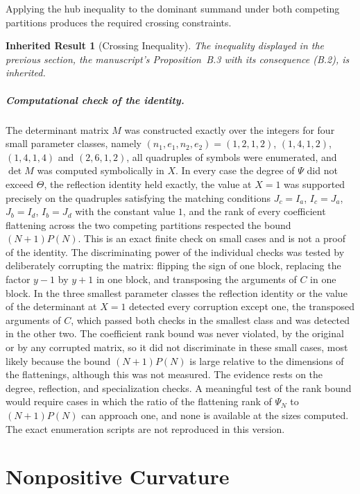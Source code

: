 \documentclass[11pt,letterpaper]{report}
\theoremstyle{plain}
\newtheorem{inherited}[theorem]{Inherited Result}
\theoremstyle{definition}
\theoremstyle{remark}
\begin{document}
Applying the hub inequality to the dominant summand under both competing partitions produces the required crossing constraints.

\begin{inherited}[Crossing Inequality]
The inequality displayed in the previous section, the manuscript's Proposition~B.3 with its consequence (B.2), is inherited.
\end{inherited}

\paragraph{Computational check of the identity.}
The determinant matrix $M$ was constructed exactly over the integers for four small parameter classes, namely $(n_1,e_1,n_2,e_2)=(1,2,1,2)$, $(1,4,1,2)$, $(1,4,1,4)$ and $(2,6,1,2)$, all quadruples of symbols were enumerated, and $\det M$ was computed symbolically in $X$. In every case the degree of $\Psi$ did not exceed $\Theta$, the reflection identity held exactly, the value at $X=1$ was supported precisely on the quadruples satisfying the matching conditions $J_c=I_a$, $I_c=J_a$, $J_b=I_d$, $I_b=J_d$ with the constant value $1$, and the rank of every coefficient flattening across the two competing partitions respected the bound $(N+1)P(N)$. This is an exact finite check on small cases and is not a proof of the identity. The discriminating power of the individual checks was tested by deliberately corrupting the matrix: flipping the sign of one block, replacing the factor $y-1$ by $y+1$ in one block, and transposing the arguments of $C$ in one block. In the three smallest parameter classes the reflection identity or the value of the determinant at $X=1$ detected every corruption except one, the transposed arguments of $C$, which passed both checks in the smallest class and was detected in the other two. The coefficient rank bound was never violated, by the original or by any corrupted matrix, so it did not discriminate in these small cases, most likely because the bound $(N+1)P(N)$ is large relative to the dimensions of the flattenings, although this was not measured. The evidence rests on the degree, reflection, and specialization checks. A meaningful test of the rank bound would require cases in which the ratio of the flattening rank of $\Psi_N$ to $(N+1)P(N)$ can approach one, and none is available at the sizes computed. The exact enumeration scripts are not reproduced in this version.

\chapter{Nonpositive Curvature}
\end{document}
